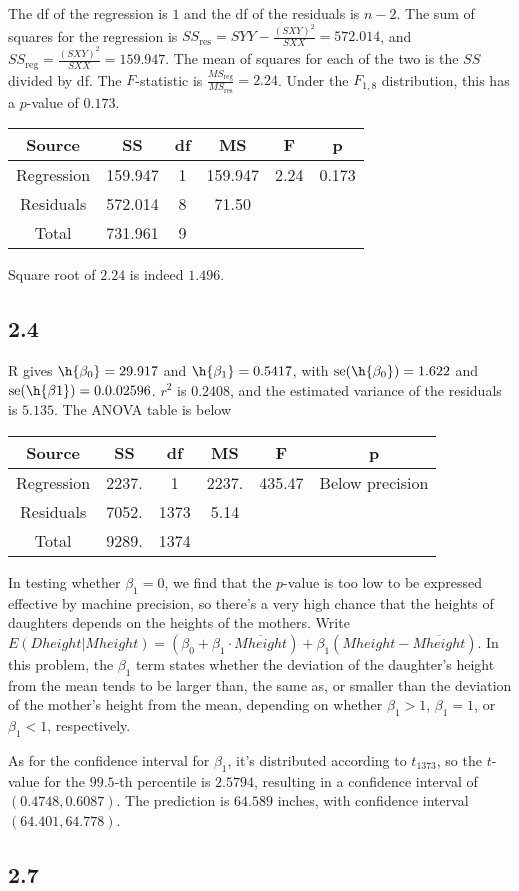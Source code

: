 \documentclass{article}
\newcommand{\conj}{\overline}
\DeclareMathOperator{\se}{se}
\begin{document}
The df of the regression is $1$ and the df of the residuals is $n-2$. The sum of squares for the regression is $SS_\text{res}=SYY-\frac{(SXY)^2}{SXX}=572.014$, and $SS_\text{reg}=\frac{(SXY)^2}{SXX}=159.947$. The mean of squares for each of the two is the $SS$ divided by df. The $F$-statistic is $\frac{MS_\text{reg}}{MS_\text{res}}=2.24$. Under the $F_{1,8}$ distribution, this has a $p$-value of $0.173$.

\begin{tabular}{cccccc}
\hline
Source & SS & df & MS & F & p\\
\hline
Regression & 159.947 & 1 & 159.947 & 2.24 & 0.173\\
Residuals & 572.014 & 8 & 71.50 \\
Total & 731.961& 9\\
\end{tabular}

Square root of $2.24$ is indeed $1.496$.

\subsection*{2.4}
R gives $\h{\beta_0}=29.917$ and $\h{\beta_1}=0.5417$, with $\se(\h{\beta_0})=1.622$ and $\se(\h{\beta{1}})=0.0.02596$. $r^2$ is $0.2408$, and the estimated variance of the residuals is $5.135$. The ANOVA table is below

\begin{tabular}{cccccc}
\hline
Source & SS & df & MS & F & p\\
\hline
Regression & 2237. & 1 & 2237. & 435.47 & Below precision\\
Residuals & 7052. & 1373 & 5.14 \\
Total &  9289. & 1374\\
\end{tabular}

In testing whether $\beta_1=0$, we find that the $p$-value is too low to be expressed effective by machine precision, so there's a very high chance that the heights of daughters depends on the heights of the mothers.
Write $E(Dheight|Mheight)=(\beta_0+\beta_1\cdot\conj{Mheight})+\beta_1(Mheight-\conj{Mheight})$. In this problem, the $\beta_1$ term states whether the deviation of the daughter's height from the mean tends to be larger than, the same as, or smaller than the deviation of the mother's height from the mean, depending on whether $\beta_1>1$, $\beta_1=1$, or $\beta_1<1$, respectively. 

As for the confidence interval for $\beta_1$, it's distributed according to $t_{1373}$, so the $t$-value for the $99.5$-th percentile is $2.5794$, resulting in a confidence interval of $(0.4748,0.6087)$.
The prediction is $64.589$ inches, with confidence interval $(64.401,64.778)$.
\subsection*{2.7}
\end{document}
